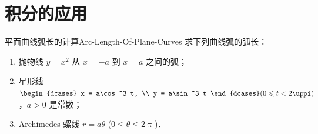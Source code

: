 \section{积分的应用}

\begin{problem}{平面曲线弧长的计算}{Arc-Length-Of-Plane-Curves}
    求下列曲线弧的弧长：
    \begin{enumerate}
        \item 抛物线 $y = x^2$ 从 $x = -a$ 到 $x = a$ 之间的弧；
        \item 星形线 $\begin{dcases} x = a\cos^3 t, \\ y = a\sin^3 t \end{dcases} (0 \leqslant t < 2\uppi)$，$a > 0$ 是常数；
        \item Archimedes 螺线 $r = a\theta$ ($0 \leqslant \theta \leqslant 2\uppi$)．
    \end{enumerate}
\end{problem}

